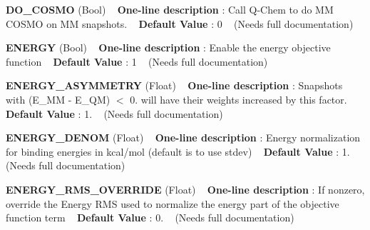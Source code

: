 \begin{DoxyItemize}
\item {\bfseries  D\+O\+\_\+\+C\+O\+S\+MO } (Bool) ~\newline
{\bfseries  One-\/line description }\+: Call Q-\/\+Chem to do MM C\+O\+S\+MO on MM snapshots. ~\newline
{\bfseries  Default Value }\+: 0 ~\newline
(Needs full documentation)\end{DoxyItemize}
\begin{DoxyItemize}
\item {\bfseries  E\+N\+E\+R\+GY } (Bool) ~\newline
{\bfseries  One-\/line description }\+: Enable the energy objective function ~\newline
{\bfseries  Default Value }\+: 1 ~\newline
(Needs full documentation)\end{DoxyItemize}
\begin{DoxyItemize}
\item {\bfseries  E\+N\+E\+R\+G\+Y\+\_\+\+A\+S\+Y\+M\+M\+E\+T\+RY } (Float) ~\newline
{\bfseries  One-\/line description }\+: Snapshots with (E\+\_\+\+MM -\/ E\+\_\+\+QM) $<$ 0. will have their weights increased by this factor. ~\newline
{\bfseries  Default Value }\+: 1. ~\newline
(Needs full documentation)\end{DoxyItemize}
\begin{DoxyItemize}
\item {\bfseries  E\+N\+E\+R\+G\+Y\+\_\+\+D\+E\+N\+OM } (Float) ~\newline
{\bfseries  One-\/line description }\+: Energy normalization for binding energies in kcal/mol (default is to use stdev) ~\newline
{\bfseries  Default Value }\+: 1. ~\newline
(Needs full documentation)\end{DoxyItemize}
\begin{DoxyItemize}
\item {\bfseries  E\+N\+E\+R\+G\+Y\+\_\+\+R\+M\+S\+\_\+\+O\+V\+E\+R\+R\+I\+DE } (Float) ~\newline
{\bfseries  One-\/line description }\+: If nonzero, override the Energy R\+MS used to normalize the energy part of the objective function term ~\newline
{\bfseries  Default Value }\+: 0. ~\newline
(Needs full documentation)\end{DoxyItemize}
